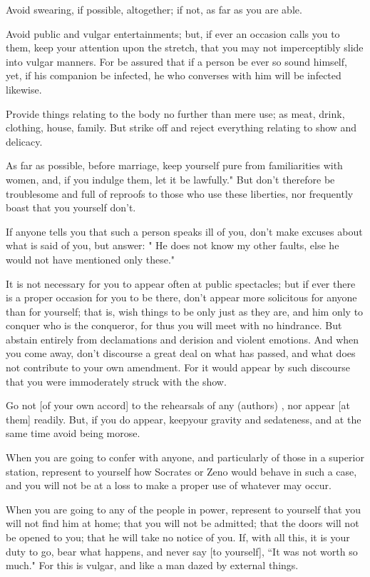\documentclass[imperial,twoside,12pt]{octavo}
\begin{document}
Avoid swearing, if possible, altogether; if not, as far as you are
able. 

Avoid public and vulgar entertainments; but, if ever an occasion calls
you to them, keep your attention upon the stretch, that you may not
imperceptibly slide into vulgar manners. For be assured that if a
person be ever so sound himself, yet, if his companion be infected,
he who converses with him will be infected likewise. 

Provide things relating to the body no further than mere use; as meat,
drink, clothing, house, family. But strike off and reject everything
relating to show and delicacy. 

As far as possible, before marriage, keep yourself pure from familiarities
with women, and, if you indulge them, let it be lawfully." But don't
therefore be troublesome and full of reproofs to those who use these
liberties, nor frequently boast that you yourself don't.

If anyone tells you that such a person speaks ill of you, don't make
excuses about what is said of you, but answer: " He does not know
my other faults, else he would not have mentioned only these."

It is not necessary for you to appear often at public spectacles;
but if ever there is a proper occasion for you to be there, don't
appear more solicitous for anyone than for yourself; that is, wish
things to be only just as they are, and him only to conquer who is
the conqueror, for thus you will meet with no hindrance. But abstain
entirely from declamations and derision and violent emotions. And
when you come away, don't discourse a great deal on what has passed,
and what does not contribute to your own amendment. For it would appear
by such discourse that you were immoderately struck with the show.

Go not [of your own accord] to the rehearsals of any 
(authors) , nor appear [at them] readily. But, if you do appear, keepyour
gravity and sedateness, and at the same time avoid being morose.

When you are going to confer with anyone, and particularly of those
in a superior station, represent to yourself how Socrates or Zeno
would behave in such a case, and you will not be at a loss to make
a proper use of whatever may occur. 

When you are going to any of the people in power, represent to yourself
that you will not find him at home; that you will not be admitted;
that the doors will not be opened to you; that he will take no notice
of you. If, with all this, it is your duty to go, bear what happens,
and never say [to yourself], ``It was not worth so much." For this
is vulgar, and like a man dazed by external things. 
\end{document}
